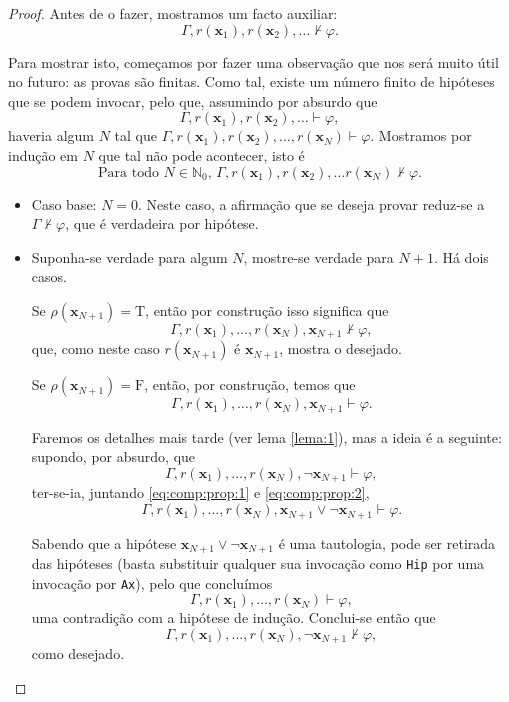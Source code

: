 \documentclass{report}
\theoremstyle{definition}
\theoremstyle{remark}
\newcommand{\N}{\mathbb{N}}
\renewcommand{\bf}[1]{\mathbf{#1}}
\newcommand{\lt}{\mathrm{T}}
\newcommand{\lf}{\mathrm{F}}
\begin{document}
\begin{proof}
	Antes de o fazer, mostramos um facto auxiliar:
	\begin{equation}\label{eq:comp:prop:-1}
	\Gamma, r(\bf x_1), r(\bf x_2), \dots \nvdash \varphi.
	\end{equation}
	
	Para mostrar isto, começamos por fazer uma observação que nos será muito útil no futuro: as provas são finitas. Como tal, existe um número finito de hipóteses que se podem invocar, pelo que, assumindo por absurdo que
	\[\Gamma, r(\bf x_1), r(\bf x_2), \dots \vdash \varphi,\]
	haveria algum $N$ tal que $\Gamma, r(\bf x_1), r(\bf x_2), \dots, r(\bf x_N) \vdash \varphi$. Mostramos por indução em $N$ que tal não pode acontecer, isto é
	\begin{equation}\label{eq:comp:prop:0}
	\text{Para todo $N \in \N_0$, } \Gamma, r(\bf x_1), r(\bf x_2), \dots r(\bf x_N) \nvdash \varphi.
	\end{equation}
	
	\begin{itemize}
	\item Caso base: $N = 0$. Neste caso, a afirmação que se deseja provar reduz-se a $\Gamma \nvdash \varphi$, que é verdadeira por hipótese.
	
	\item Suponha-se verdade para algum $N$, mostre-se verdade para $N+1$. Há dois casos.
	
	Se $\rho(\bf x_{N+1}) = \lt$, então por construção isso significa que
	\[\Gamma, r(\bf x_1), \dots, r(\bf x_N), \bf x_{N+1} \nvdash \varphi,\]
	que, como neste caso $r(\bf x_{N+1})$ é $\bf x_{N+1}$, mostra o desejado.
	
	Se $\rho(\bf x_{N+1}) = \lf$, então, por construção, temos que
	\begin{equation}\label{eq:comp:prop:1}
	\Gamma, r(\bf x_1), \dots, r(\bf x_N), \bf x_{N+1} \vdash \varphi.
	\end{equation}
	
	Faremos os detalhes mais tarde (ver lema \ref{lema:1}), mas a ideia é a seguinte: supondo, por absurdo, que
	\begin{equation}\label{eq:comp:prop:2}
	\Gamma, r(\bf x_1), \dots, r(\bf x_N), \neg \bf x_{N+1} \vdash \varphi,
	\end{equation}
	ter-se-ia, juntando \eqref{eq:comp:prop:1} e \eqref{eq:comp:prop:2},
	\[\Gamma, r(\bf x_1), \dots, r(\bf x_N), \bf x_{N+1} \lor \neg \bf x_{N+1} \vdash \varphi.\]
	
	Sabendo que a hipótese $\bf x_{N+1} \lor \neg \bf x_{N+1}$ é uma tautologia, pode ser retirada das hipóteses (basta substituir qualquer sua invocação como \texttt{Hip} por uma invocação por \texttt{Ax}), pelo que concluímos
	\[\Gamma, r(\bf x_1), \dots, r(\bf x_N) \vdash \varphi,\]
	uma contradição com a hipótese de indução. Conclui-se então que
	\[\Gamma, r(\bf x_1), \dots, r(\bf x_N), \neg \bf x_{N+1} \nvdash \varphi,\]
	como desejado.
	\end{itemize}
	

\end{proof}
\end{document}
